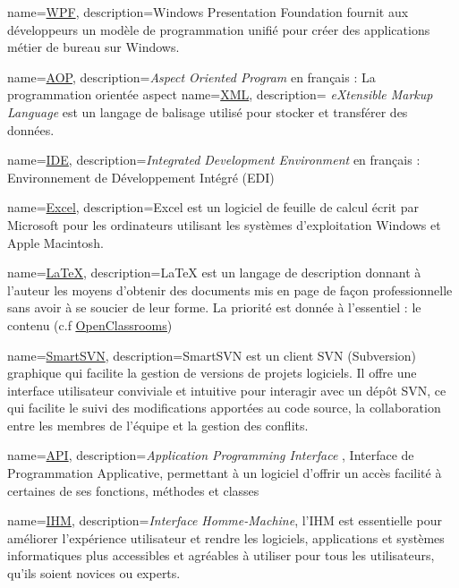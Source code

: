 \usepackage[toc,section=chapter]{glossaries}    %

\makeglossaries

{
	name=\underline{WPF},
	description={Windows Presentation Foundation fournit aux développeurs un modèle de programmation unifié pour créer des applications métier de bureau sur Windows.}
}

{
	name=\underline{AOP},
	description={\textit{Aspect Oriented Program} en français :  La programmation orientée aspect }
}
{
	name=\underline{XML},
	description={ \textit{eXtensible Markup Language} est un langage de balisage utilisé pour stocker et transférer des données.}
}

{
	name=\underline{IDE},
	description={\textit{Integrated Development Environment} en français :  Environnement de Développement Intégré (EDI) }
}

{
	name=\underline{Excel},
	description={Excel est un logiciel de feuille de calcul écrit par Microsoft pour les ordinateurs utilisant les systèmes d'exploitation Windows et Apple Macintosh.}
}

{
	name=\underline{LaTeX},
	description={LaTeX est un langage de description donnant à l'auteur les moyens d'obtenir des documents mis en page de façon professionnelle sans avoir à se soucier de leur forme. La priorité est donnée à l'essentiel : le contenu (c.f \underline{\href{https://openclassrooms.com/fr/courses/1617396-redigez-des-documents-de-qualite-avec-latex/1617565-quest-ce-que-latex}{OpenClassrooms}})}
}

{
	name=\underline{SmartSVN},
	description={SmartSVN est un client SVN (Subversion) graphique qui facilite la gestion de versions de projets logiciels. Il offre une interface utilisateur conviviale et intuitive pour interagir avec un dépôt SVN, ce qui facilite le suivi des modifications apportées au code source, la collaboration entre les membres de l'équipe et la gestion des conflits.}
}


{
	name=\underline{API},
	description={\textit{Application Programming Interface }, Interface de Programmation Applicative, permettant à un logiciel d'offrir un accès facilité à certaines de ses fonctions, méthodes et classes}
}

{
	name=\underline{IHM},
	description={\textit{Interface Homme-Machine}, l'IHM est essentielle pour améliorer l'expérience utilisateur et rendre les logiciels, applications et systèmes informatiques plus accessibles et agréables à utiliser pour tous les utilisateurs, qu'ils soient novices ou experts.}
}

\glsaddall